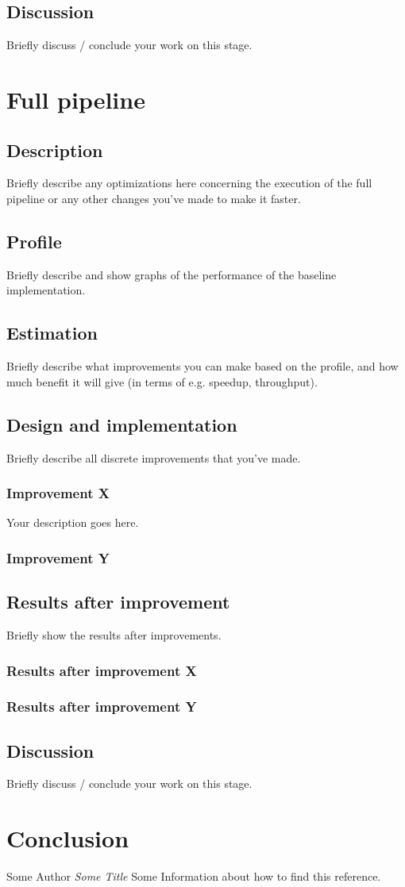 \documentclass[twocolumn]{article}
\begin{document}
\subsection{Discussion}
Briefly discuss / conclude your work on this stage.

\section{Full pipeline}
\subsection{Description}
Briefly describe any optimizations here concerning the execution of the full pipeline or any other changes you've made to make it faster.
\subsection{Profile}
Briefly describe and show graphs of the performance of the baseline implementation.
\subsection{Estimation}
Briefly describe what improvements you can make based on the profile, and how much benefit it will give (in terms of e.g. speedup, throughput).
\subsection{Design and implementation}
Briefly describe all discrete improvements that you've made.
\subsubsection{Improvement X}
Your description goes here.
\subsubsection{Improvement Y}
\subsection{Results after improvement}
Briefly show the results after improvements.
\subsubsection{Results after improvement X}
\subsubsection{Results after improvement Y}
\subsection{Discussion}
Briefly discuss / conclude your work on this stage.

\section{Conclusion}

\begin{thebibliography}{}
Some Author
\textit{Some Title}
Some Information about how to find this reference.
\end{thebibliography}
\end{document}
